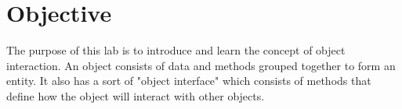 \section{Objective}

The purpose of this lab is to introduce and learn the concept of object interaction. An object consists of data and methods grouped together to form an entity. It also has a sort of "object interface" which consists of methods that define how the object will interact with other objects.